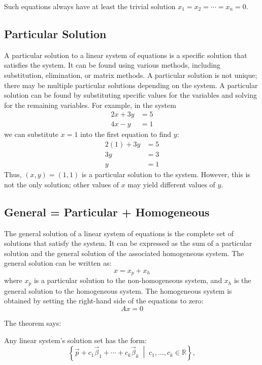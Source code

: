 Such equations always have at least the trivial solution \(x_1 = x_2 = \cdots = x_n = 0\).

\subsection{Particular Solution}
A particular solution to a linear system of equations is a specific solution that satisfies the system. It can be found using various methods, including substitution, elimination, or matrix methods. A particular solution is not unique; there may be multiple particular solutions depending on the system.
A particular solution can be found by substituting specific values for the variables and solving for the remaining variables. For example, in the system
\begin{align*}
	2x + 3y & = 5 \\
	4x - y  & = 1
\end{align*}
we can substitute \(x = 1\) into the first equation to find \(y\):
\begin{align*}
	2(1) + 3y & = 5 \\
	3y        & = 3 \\
	y         & = 1
\end{align*}
Thus, \((x, y) = (1, 1)\) is a particular solution to the system. However, this is not the only solution; other values of \(x\) may yield different values of \(y\).

\subsection{General = Particular + Homogeneous}
The general solution of a linear system of equations is the complete set of solutions that satisfy the system. It can be expressed as the sum of a particular solution and the general solution of the associated homogeneous system.
The general solution can be written as:
\begin{equation*}
	x = x_p + x_h
\end{equation*}
where \( x_p \) is a particular solution to the non-homogeneous system, and \( x_h \) is the general solution to the homogeneous system.
The homogeneous system is obtained by setting the right-hand side of the equations to zero:
\begin{equation*}
	A x = 0
\end{equation*}

 The theorem says:

Any linear system's solution set has the form:
\[
	\left\{ \vec{p} + c_1\vec{\beta}_1 + \cdots + c_k\vec{\beta}_k \;\middle|\; c_1, \ldots, c_k \in \mathbb{R} \right\},
\]

